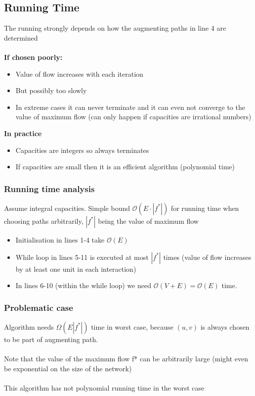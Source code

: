\documentclass{article}[18pt]
\begin{document}
\subsection{Running Time}
The running strongly depends on how the augmenting paths in line 4 are determined\\
\\
\textbf{If chosen poorly:}
\begin{itemize}
	\item Value of flow increases with each iteration
	\item But possibly too slowly
	\item In extreme cases it can never terminate and it can even not converge to the value of maximum flow (can only happen if capacities are irrational numbers)
\end{itemize}
\textbf{In practice}
\begin{itemize}
	\item Capacities are integers so always terminates
	\item If capacities are small then it is an efficient algorithm (polynomial time)
\end{itemize}
\subsubsection{Running time analysis}
Assume integral capacities. Simple bound $\mathcal{O}(E\cdot |f^*|)$ for running time when choosing paths arbitrarily, $|f^*|$ being the value of maximum flow
\begin{itemize}
	\item Initialisation in lines 1-4 take $\mathcal{O}(E)$
	\item While loop in lines 5-11 is executed at most $|f^*|$ times (value of flow increases by at least one unit in each interaction)
	\item In lines 6-10 (within the while loop) we need $\mathcal{O}(V+E)=\mathcal{O}(E)$ time. 
\end{itemize}
\subsubsection{Problematic case}
Algorithm needs $\Omega(E|f^*|)$ time in worst case, because $(u,v)$ is always chosen to be part of augmenting path.\\
\\
Note that the value of the maximum flow f* can be arbitrarily large (might even be exponential on the size of the network)\\
\\
This algorithm has not polynomial running time in the worst case
\end{document}
